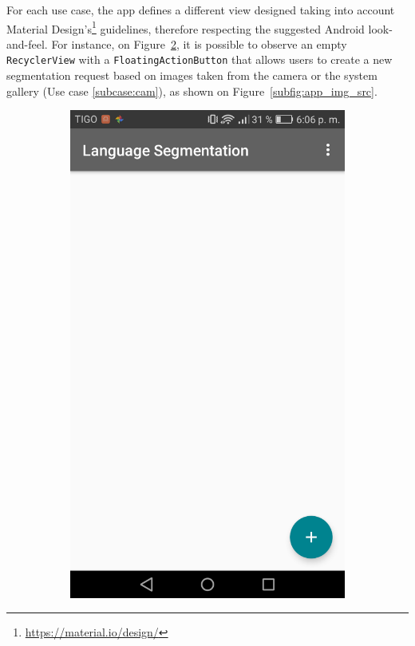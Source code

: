 For each use case, the app defines a different view designed taking into account Material Design's\footnote{\url{https://material.io/design/}} guidelines, therefore respecting the suggested Android look-and-feel. For instance, on Figure~\ref{subfig:app_main}, it is possible to observe an empty \texttt{RecyclerView} with a \texttt{FloatingActionButton} that allows users to create a new segmentation request based on images taken from the camera or the system gallery (Use case \ref{subcase:cam}), as shown on Figure~\ref{subfig:app_img_src}. 

\begin{figure}[!htbp]
    \centering
    \begin{multicols}{2}
    \begin{subfigure}[b]{\columnwidth}
            \centering
            \includegraphics[width=\textwidth]{./figures/dmn_app/views/1.png}
    \label{subfig:app_main}
    \end{subfigure}
    

\end{multicols}
\end{figure}
